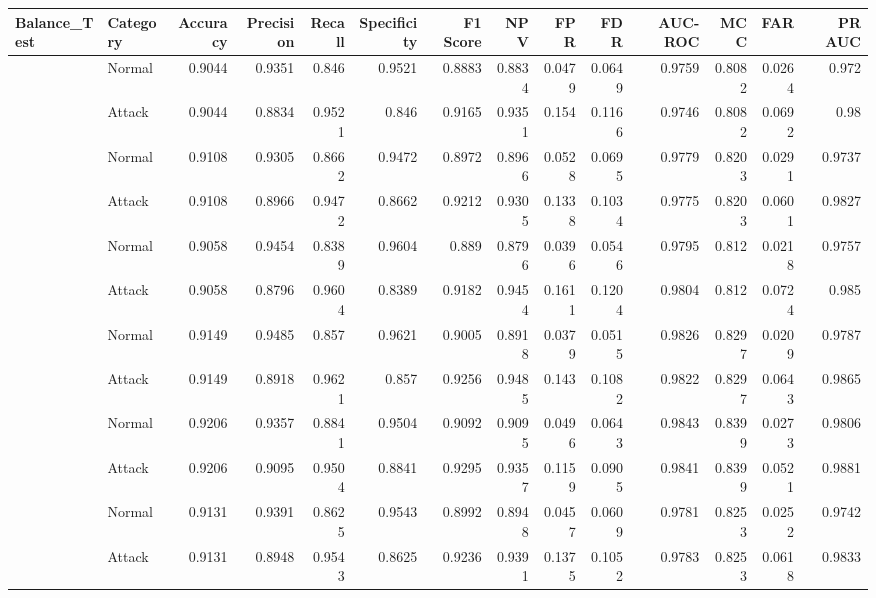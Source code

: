 \begin{tabular}{llrrrrrrrrrrrr}
\hline
 Balance_Test   & Category   &   Accuracy &   Precision &   Recall &   Specificity &   F1 Score &    NPV &    FPR &    FDR &   AUC-ROC &    MCC &    FAR &   PR AUC \\
\hline
                & Normal     &     0.9044 &      0.9351 &   0.846  &        0.9521 &     0.8883 & 0.8834 & 0.0479 & 0.0649 &    0.9759 & 0.8082 & 0.0264 &   0.972  \\
                & Attack     &     0.9044 &      0.8834 &   0.9521 &        0.846  &     0.9165 & 0.9351 & 0.154  & 0.1166 &    0.9746 & 0.8082 & 0.0692 &   0.98   \\
                & Normal     &     0.9108 &      0.9305 &   0.8662 &        0.9472 &     0.8972 & 0.8966 & 0.0528 & 0.0695 &    0.9779 & 0.8203 & 0.0291 &   0.9737 \\
                & Attack     &     0.9108 &      0.8966 &   0.9472 &        0.8662 &     0.9212 & 0.9305 & 0.1338 & 0.1034 &    0.9775 & 0.8203 & 0.0601 &   0.9827 \\
                & Normal     &     0.9058 &      0.9454 &   0.8389 &        0.9604 &     0.889  & 0.8796 & 0.0396 & 0.0546 &    0.9795 & 0.812  & 0.0218 &   0.9757 \\
                & Attack     &     0.9058 &      0.8796 &   0.9604 &        0.8389 &     0.9182 & 0.9454 & 0.1611 & 0.1204 &    0.9804 & 0.812  & 0.0724 &   0.985  \\
                & Normal     &     0.9149 &      0.9485 &   0.857  &        0.9621 &     0.9005 & 0.8918 & 0.0379 & 0.0515 &    0.9826 & 0.8297 & 0.0209 &   0.9787 \\
                & Attack     &     0.9149 &      0.8918 &   0.9621 &        0.857  &     0.9256 & 0.9485 & 0.143  & 0.1082 &    0.9822 & 0.8297 & 0.0643 &   0.9865 \\
                & Normal     &     0.9206 &      0.9357 &   0.8841 &        0.9504 &     0.9092 & 0.9095 & 0.0496 & 0.0643 &    0.9843 & 0.8399 & 0.0273 &   0.9806 \\
                & Attack     &     0.9206 &      0.9095 &   0.9504 &        0.8841 &     0.9295 & 0.9357 & 0.1159 & 0.0905 &    0.9841 & 0.8399 & 0.0521 &   0.9881 \\
                & Normal     &     0.9131 &      0.9391 &   0.8625 &        0.9543 &     0.8992 & 0.8948 & 0.0457 & 0.0609 &    0.9781 & 0.8253 & 0.0252 &   0.9742 \\
                & Attack     &     0.9131 &      0.8948 &   0.9543 &        0.8625 &     0.9236 & 0.9391 & 0.1375 & 0.1052 &    0.9783 & 0.8253 & 0.0618 &   0.9833 \\

\end{tabular}
